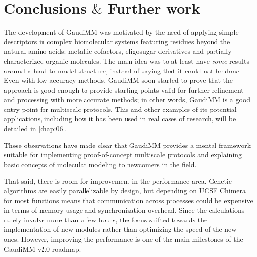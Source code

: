 \section{Conclusions $\&$  Further work}

The development of GaudiMM was motivated by the need of applying simple descriptors in complex biomolecular systems featuring residues beyond the natural amino acids: metallic cofactors, oligosugar-derivatives and partially characterized organic molecules. The main idea was to at least have \textit{some} results around a hard-to-model structure, instead of saying that it could not be done. Even with low accuracy methods, GaudiMM soon started to prove that the approach is good enough to provide starting points valid for further refinement and processing with more accurate methods; in other words, GaudiMM is a good entry point for multiscale protocols. This and other examples of its potential applications, including how it has been used in real cases of research, will be detailed in \autoref{chap:06}.

These observations have made clear that GaudiMM provides a mental framework suitable for implementing proof-of-concept multiscale protocols and explaining basic concepts of molecular modeling to newcomers in the field.

That said, there is room for improvement in the performance area. Genetic algorithms are easily parallelizable by design, but depending on UCSF Chimera for most functions means that communication across processes could be expensive in terms of memory usage and synchronization overhead. Since the calculations rarely involve more than a few hours, the focus shifted towards the implementation of new modules rather than optimizing the speed of the new ones. However, improving the performance is one of the main milestones of the GaudiMM v2.0 roadmap.
